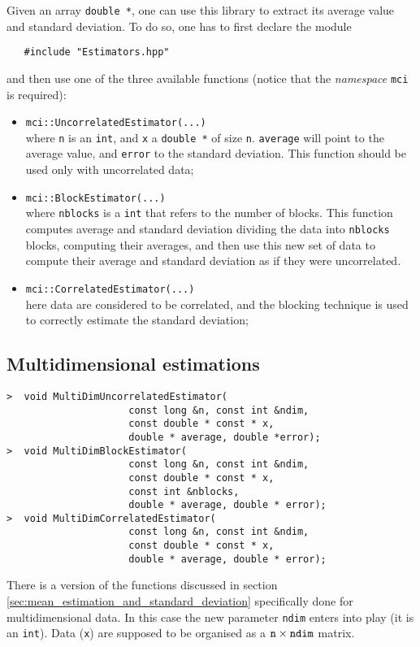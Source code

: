 \documentclass[11pt,a4paper,twoside]{article}
\begin{document}
Given an array \verb+double *+, one can use this library to extract its average value and standard deviation.
To do so, one has to first declare the module
\begin{verbatim}
   #include "Estimators.hpp"
\end{verbatim}
and then use one of the three available functions (notice that the \emph{namespace} \verb+mci+ is required):
\begin{itemize}
\item \verb+mci::UncorrelatedEstimator(...)+ \\ where \verb+n+ is an \verb+int+, and \verb+x+ a \verb+double *+ of size \verb+n+. \verb+average+ will point to the average value, and \verb+error+ to the standard deviation. This function should be used only with uncorrelated data;
\item \verb+mci::BlockEstimator(...)+ \\ where \verb+nblocks+ is a \verb+int+ that refers to the number of blocks. This function computes average and standard deviation dividing the data into \verb+nblocks+ blocks, computing their averages, and then use this new set of data to compute their average and standard deviation as if they were uncorrelated.
\item \verb+mci::CorrelatedEstimator(...)+ \\ here data are considered to be correlated, and the blocking technique is used to correctly estimate the standard deviation;
\end{itemize}


\subsection{Multidimensional estimations} %
\label{sub:multidimensional_estimations}

\begin{verbatim}
>  void MultiDimUncorrelatedEstimator(
                     const long &n, const int &ndim,
                     const double * const * x,
                     double * average, double *error);
>  void MultiDimBlockEstimator(
                     const long &n, const int &ndim,
                     const double * const * x,
                     const int &nblocks,
                     double * average, double * error);
>  void MultiDimCorrelatedEstimator(
                     const long &n, const int &ndim,
                     const double * const * x,
                     double * average, double * error);
\end{verbatim}

There is a version of the functions discussed in section \ref{sec:mean_estimation_and_standard_deviation} specifically done for multidimensional data.
In this case the new parameter \verb+ndim+ enters into play (it is an \verb+int+).
Data (\verb+x+) are supposed to be organised as a $\verb+n+ \times \verb+ndim+$ matrix.



\printindex
\end{document}

